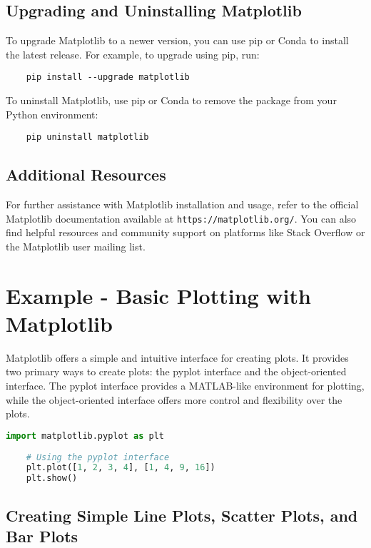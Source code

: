 \subsection{Upgrading and Uninstalling Matplotlib}
To upgrade Matplotlib to a newer version, you can use pip or Conda to install the latest release. For example, to upgrade using pip, run:
\begin{lstlisting}
	pip install --upgrade matplotlib
\end{lstlisting}
To uninstall Matplotlib, use pip or Conda to remove the package from your Python environment:
\begin{lstlisting}
	pip uninstall matplotlib
\end{lstlisting}

\subsection{Additional Resources}
For further assistance with Matplotlib installation and usage, refer to the official Matplotlib documentation available at \texttt{https://matplotlib.org/}. You can also find helpful resources and community support on platforms like Stack Overflow or the Matplotlib user mailing list.




\section{Example - Basic Plotting with Matplotlib}

Matplotlib offers a simple and intuitive interface for creating plots. It provides two primary ways to create plots: the pyplot interface and the object-oriented interface. The pyplot interface provides a MATLAB-like environment for plotting, while the object-oriented interface offers more control and flexibility over the plots.\cite{Scipymatplotlib:2024}

\begin{lstlisting}[language=Python]
	import matplotlib.pyplot as plt
	
	# Using the pyplot interface
	plt.plot([1, 2, 3, 4], [1, 4, 9, 16])
	plt.show()
\end{lstlisting}

\subsection*{Creating Simple Line Plots, Scatter Plots, and Bar Plots}

